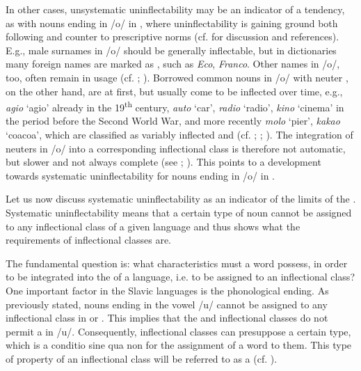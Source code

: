 \documentclass[output=paper,colorlinks,citecolor=brown]{langscibook}
\begin{document}
In other cases, unsystematic uninflectability may be an indicator of a tendency, as with nouns ending in /o/ in , where uninflectability is gaining ground both following and counter to prescriptive norms (cf. \citealt[56, 68--70, 98--100, 113, 126, 138]{doleschal2000} for discussion and references). E.g., male surnames in /o/ should be generally inflectable, but in dictionaries many foreign names are marked as , such as \emph{Eco}, \emph{Franco}. Other names in /o/, too, often remain  in usage (cf. \citealt[68--70]{doleschal2000}; \citealt[21, 41]{krzyzanowski2013}). Borrowed common nouns in /o/ with neuter , on the other hand, are  at first, but usually come to be inflected over time, e.g., \emph{agio} `agio' already in the 19\textsuperscript{th} century, \emph{auto} `car', \emph{radio} `radio', \emph{kino} `cinema' in the period before the Second World War, and more recently \emph{molo} `pier', \emph{kakao} `coacoa', which are classified as variably inflected and  (cf. \citealt[126]{doleschal2000}; \citealt{zmigrodzki2004-2021}; \citealt{wolinski2020}). The integration of neuters in /o/ into a corresponding inflectional class is therefore not automatic, but slower and not always complete (see \citealt[102]{dresslerdziubalskakolaczykfabiszak1997}; \citealt[112]{orzechowska1974}). This points to a development towards systematic uninflectability for nouns ending in /o/ in .

Let us now discuss systematic uninflectability as an indicator of the limits of the . Systematic uninflectability means that a certain type of noun cannot be assigned to any inflectional class of a given language and thus shows what the requirements of inflectional classes are.

The fundamental question is: what characteristics must a word possess, in order to be integrated into the  of a language, i.e. to be assigned to an inflectional class? One important factor in the Slavic languages is the phonological ending. As previously stated, nouns ending in the vowel /u/ cannot be assigned to any inflectional class in  or . This implies that the  and  inflectional classes do not permit a  in /u/. Consequently, inflectional classes can presuppose a certain  type, which is a conditio sine qua non for the assignment of a word to them. This type of property of an inflectional class will be referred to as a \textit{} (cf. \citealt{doleschal1997, doleschal2006}).
\end{document}
